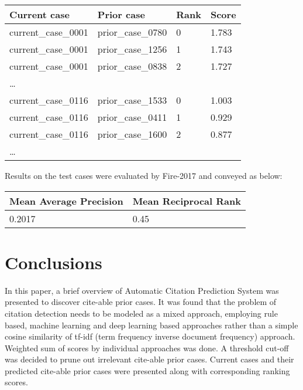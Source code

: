 \begin{center}
\begin{tabular}[h]{ l  l  l l  }
{\bf Current case} &   {\bf Prior case} & {\bf Rank}  & {\bf Score} \\ \hline
current\_case\_0001 &    prior\_case\_0780  &  0  &  1.783 \\
current\_case\_0001 & prior\_case\_1256  &  1  &  1.743 \\
current\_case\_0001 &     prior\_case\_0838  &  2  &  1.727 \\
\ldots\\
current\_case\_0116 & prior\_case\_1533  &  0  &  1.003\\
current\_case\_0116 & prior\_case\_0411  &  1  &  0.929 \\
current\_case\_0116 & prior\_case\_1600  &  2  &  0.877 \\
\ldots\\
\end{tabular}
\label{tab:results}
\end{center}
Results on the test cases were evaluated by Fire-2017\cite{fire2017} and conveyed as below:
\begin{center}
\begin{tabular}[h]{ |l |  l|} \hline
{\bf Mean Average Precision}  & {\bf Mean Reciprocal Rank} \\ \hline
0.2017  & 0.45 \\ \hline
			\end{tabular}
\label{tab:verbose}
\end{center}

\section{Conclusions}
\label{sec:conclusions}
In this paper, a brief overview of Automatic Citation Prediction System was presented to discover cite-able prior cases. It was found that the problem of citation detection needs to be modeled as a mixed approach, employing rule based, machine learning and deep learning based approaches  rather than a simple cosine similarity of tf-idf (term frequency inverse document frequency) approach. Weighted sum of scores by individual approaches was done. A threshold cut-off was decided to prune out irrelevant cite-able prior cases. Current cases and their predicted cite-able prior cases were presented along with corresponding ranking scores.

